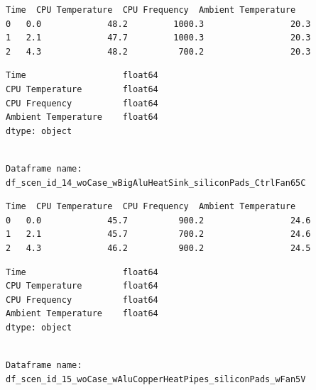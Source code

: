 \documentclass[10pt,parskip=half,
toc=sectionentrywithdots,
bibliography=totocnumbered,
captions=tableheading,numbers=noendperiod]{scrartcl}
\begin{document}
\begin{lstlisting}[language={},postbreak={},numbers=none,xrightmargin=7pt,breakindent=0pt,aboveskip=5pt,belowskip=5pt]
   Time  CPU Temperature  CPU Frequency  Ambient Temperature
0   0.0             48.2         1000.3                 20.3
1   2.1             47.7         1000.3                 20.3
2   4.3             48.2          700.2                 20.3
\end{lstlisting}

\begin{lstlisting}[language={},postbreak={},numbers=none,xrightmargin=7pt,breakindent=0pt,aboveskip=5pt,belowskip=5pt]
Time                   float64
CPU Temperature        float64
CPU Frequency          float64
Ambient Temperature    float64
dtype: object
\end{lstlisting}

\begin{lstlisting}[language={},postbreak={},numbers=none,xrightmargin=7pt,belowskip=5pt,aboveskip=5pt,breakindent=0pt]

Dataframe name: df_scen_id_14_woCase_wBigAluHeatSink_siliconPads_CtrlFan65C

\end{lstlisting}

\begin{lstlisting}[language={},postbreak={},numbers=none,xrightmargin=7pt,breakindent=0pt,aboveskip=5pt,belowskip=5pt]
   Time  CPU Temperature  CPU Frequency  Ambient Temperature
0   0.0             45.7          900.2                 24.6
1   2.1             45.7          700.2                 24.6
2   4.3             46.2          900.2                 24.5
\end{lstlisting}

\begin{lstlisting}[language={},postbreak={},numbers=none,xrightmargin=7pt,breakindent=0pt,aboveskip=5pt,belowskip=5pt]
Time                   float64
CPU Temperature        float64
CPU Frequency          float64
Ambient Temperature    float64
dtype: object
\end{lstlisting}

\begin{lstlisting}[language={},postbreak={},numbers=none,xrightmargin=7pt,belowskip=5pt,aboveskip=5pt,breakindent=0pt]

Dataframe name: df_scen_id_15_woCase_wAluCopperHeatPipes_siliconPads_wFan5V

\end{lstlisting}
\end{document}
